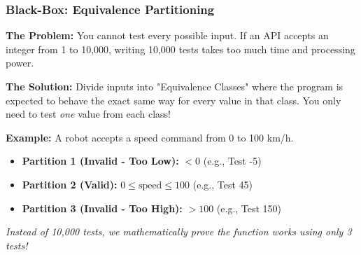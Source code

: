 \documentclass[xcolor=table]{beamer}
\begin{document}
\begin{frame}[fragile]
    \frametitle{Black-Box: Equivalence Partitioning}
    \textbf{The Problem:} You cannot test every possible input. If an API accepts an integer from 1 to 10,000, writing 10,000 tests takes too much time and processing power.
    
    \textbf{The Solution:} Divide inputs into "Equivalence Classes" where the program is expected to behave the exact same way for every value in that class. You only need to test \textit{one} value from each class!
    
    \vspace{0.3cm}
    \textbf{Example:} A robot accepts a speed command from 0 to 100 km/h.
    \begin{itemize}
        \item \textbf{Partition 1 (Invalid - Too Low):} $< 0$ (e.g., Test -5)
        \item \textbf{Partition 2 (Valid):} $0 \le \text{speed} \le 100$ (e.g., Test 45)
        \item \textbf{Partition 3 (Invalid - Too High):} $> 100$ (e.g., Test 150)
    \end{itemize}
    \textit{Instead of 10,000 tests, we mathematically prove the function works using only 3 tests!}
\end{frame}
\end{document}
